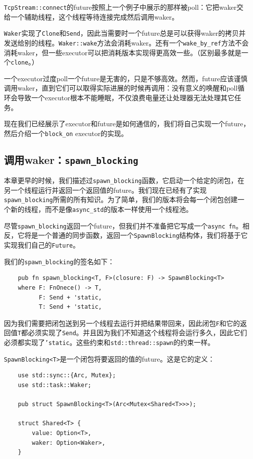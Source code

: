 \texttt{TcpStream::connect}的future按照上一个例子中展示的那样被poll：它把waker交给一个辅助线程，这个线程等待连接完成然后调用waker。

\texttt{Waker}实现了\texttt{Clone}和\texttt{Send}，因此当需要时一个future总是可以获得waker的拷贝并发送给别的线程。\texttt{Waker::wake}方法会消耗waker。还有一个\texttt{wake\_by\_ref}方法不会消耗waker，但一些executor可以把消耗版本实现得更高效一些。（区别最多就是一个\texttt{clone}。）

一个executor过度poll一个future是无害的，只是不够高效。然而，future应该谨慎调用waker，直到它们可以取得实际进展的时候再调用：没有意义的唤醒和poll循环会导致一个executor根本不能睡眠，不仅浪费电量还让处理器无法处理其它任务。

现在我们已经展示了executor和future是如何通信的，我们将自己实现一个future，然后介绍一个\texttt{block\_on} executor的实现。

\subsection{调用waker：\texttt{spawn\_blocking}}\label{InvokeWaker}
本章更早的时候，我们描述过\texttt{spawn\_blocking}函数，它启动一个给定的闭包，在另一个线程运行并返回一个返回值的future。我们现在已经有了实现\texttt{spawn\_blocking}所需的所有知识。为了简单，我们的版本将会每一个闭包创建一个新的线程，而不是像\texttt{async\_std}的版本一样使用一个线程池。

尽管\texttt{spawn\_blocking}返回一个future，但我们并不准备把它写成一个\texttt{async fn}。相反，它将是一个普通的同步函数，返回一个\texttt{SpawnBlocking}结构体，我们将基于它实现我们自己的\texttt{Future}。

我们的\texttt{spawn\_blocking}的签名如下：
\begin{verbatim}
    pub fn spawn_blocking<T, F>(closure: F) -> SpawnBlocking<T>
    where F: FnOnece() -> T,
          F: Send + 'static,
          T: Send + 'static,
\end{verbatim}

因为我们需要把闭包送到另一个线程去运行并把结果带回来，因此闭包\texttt{F}和它的返回值\texttt{T}都必须实现了\texttt{Send}。并且因为我们不知道这个线程将会运行多久，因此它们必须都实现了\texttt{'static}。这些约束和\texttt{std::thread::spawn}的约束一样。

\texttt{SpawnBlocking<T>}是一个闭包将要返回的值的future。这是它的定义：
\begin{verbatim}
    use std::sync::{Arc, Mutex};
    use std::task::Waker;

    pub struct SpawnBlocking<T>(Arc<Mutex<Shared<T>>>);

    struct Shared<T> {
        value: Option<T>,
        waker: Option<Waker>,
    }
\end{verbatim}

